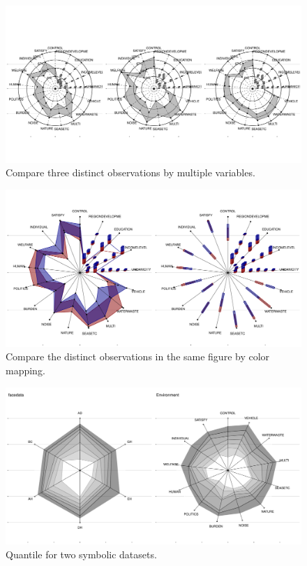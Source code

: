 \documentclass[article]{jss}
\begin{document}
\begin{appendix}
\begin{figure}[t!]
\centering
\includegraphics[width=1\textwidth]{pic/radar_3obs} 
\caption{\label{fig:radar_3obs} Compare three distinct observations by multiple variables.}
\end{figure}



\begin{figure}[t!]
\centering
\includegraphics[width=1\textwidth]{pic/radar} 
\caption{\label{fig:radar}  Compare the distinct observations in the same figure by color mapping.}
\end{figure}



\begin{figure}[t!]
\centering
\includegraphics[width=1\textwidth]{pic/radar_2datasets} 
\caption{\label{fig:quantile2} Quantile for two symbolic datasets.}
\end{figure}


\end{appendix}
\end{document}
